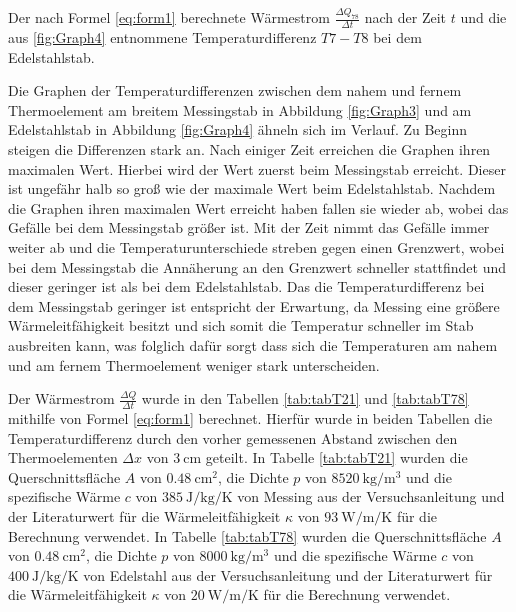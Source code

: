 \begin{table}
	\centering
	\caption{Der nach Formel \eqref{eq:form1} berechnete Wärmestrom $\frac{\Delta Q_{78}}{\Delta t}$ nach der Zeit $t$ und die aus \ref{fig:Graph4} entnommene Temperaturdifferenz $T7-T8$ bei dem Edelstahlstab.}
	
\end{table}
Die Graphen der Temperaturdifferenzen zwischen dem nahem und fernem Thermoelement am breitem Messingstab in Abbildung \ref{fig:Graph3} und am Edelstahlstab in Abbildung \ref{fig:Graph4} ähneln sich im Verlauf. Zu Beginn steigen die Differenzen stark an. Nach einiger Zeit erreichen die Graphen ihren maximalen Wert. Hierbei wird der Wert zuerst beim Messingstab erreicht. Dieser ist ungefähr halb so groß wie der maximale Wert beim Edelstahlstab. Nachdem die Graphen ihren maximalen Wert erreicht haben fallen sie wieder ab, wobei das Gefälle bei dem Messingstab größer ist. Mit der Zeit nimmt das Gefälle immer weiter ab und die Temperaturunterschiede streben gegen einen Grenzwert, wobei bei dem Messingstab die Annäherung an den Grenzwert schneller stattfindet und dieser geringer ist als bei dem Edelstahlstab. Das die Temperaturdifferenz bei dem Messingstab geringer ist entspricht der Erwartung, da Messing eine größere Wärmeleitfähigkeit besitzt und sich somit die Temperatur schneller im Stab ausbreiten kann, was folglich dafür sorgt dass sich die Temperaturen am nahem und am fernem Thermoelement weniger stark unterscheiden.

Der Wärmestrom $\frac{\Delta Q}{\Delta t}$ wurde in den Tabellen \ref{tab:tabT21} und \ref{tab:tabT78} mithilfe von Formel \eqref{eq:form1} berechnet. Hierfür wurde in beiden Tabellen die Temperaturdifferenz durch den vorher gemessenen Abstand zwischen den Thermoelementen $\Delta x$ von $\SI{3}{\centi\meter}$ geteilt. In Tabelle \ref{tab:tabT21} wurden die Querschnittsfläche $A$ von $\SI{0.48}{\centi\meter\squared}$, die Dichte $p$ von $\SI{8520}{\kilo\gram\per\meter\tothe{3}}$ und die spezifische Wärme $c$ von $\SI{385}{\joule\per\kilo\gram\per\kelvin}$ von Messing aus der Versuchsanleitung \cite{V204} und der Literaturwert für die Wärmeleitfähigkeit $\kappa$ von $\SI{93}{\watt\per\meter\per\kelvin}$ \cite{km} für die Berechnung verwendet.
In Tabelle \ref{tab:tabT78} wurden die Querschnittsfläche $A$ von $\SI{0.48}{\centi\meter\squared}$, die Dichte $p$ von $\SI{8000}{\kilo\gram\per\meter\tothe{3}}$ und die spezifische Wärme $c$ von $\SI{400}{\joule\per\kilo\gram\per\kelvin}$ von Edelstahl aus der Versuchsanleitung \cite{V204} und der Literaturwert für die Wärmeleitfähigkeit $\kappa$ von $\SI{20}{\watt\per\meter\per\kelvin}$ \cite{km} für die Berechnung verwendet.
